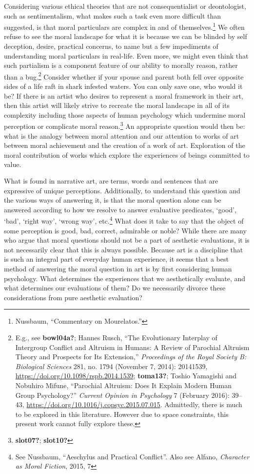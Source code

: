 \documentclass[
  12pt,
]{book}
\theoremstyle{definition}
\theoremstyle{definition}
\theoremstyle{definition}
\theoremstyle{definition}
\theoremstyle{remark}
\begin{document}
Considering various ethical theories that are not consequentialist or deontologist, such as sentimentalism, what makes such a task even more difficult than suggested, is that moral particulars are complex in and of themselves.\footnote{Nussbaum, {``Commentary on {Mourelatos}.''}} We often refuse to see the moral landscape for what it is because we can be blinded by self deception, desire, practical concerns, to name but a few impediments of understanding moral particulars in real-life. Even more, we might even think that such partialism is a component feature of our ability to morally reason, rather than a bug.\footnote{E.g., see \textbf{bowl04a?}; Hannes Rusch, {``The Evolutionary Interplay of Intergroup Conflict and Altruism in Humans: A Review of Parochial Altruism Theory and Prospects for Its Extension,''} \emph{Proceedings of the Royal Society B: Biological Sciences} 281, no. 1794 (November 7, 2014): 20141539, \url{https://doi.org/10.1098/rspb.2014.1539}; \textbf{toma13?}; Toshio Yamagishi and Nobuhiro Mifune, {``Parochial {Altruism}: {Does It Explain Modern Human Group Psychology}?''} \emph{Current Opinion in Psychology} 7 (February 2016): 39--43, \url{https://doi.org/10.1016/j.copsyc.2015.07.015}. Admittedly, there is much to be explored in this literature. However due to space constraints, this present work cannot fully explore these.} Consider whether if your spouse and parent both fell over opposite sides of a life raft in shark infested waters. You can only save one, who would it be? If there is an artist who desires to represent a moral framework in their art, then this artist will likely strive to recreate the moral landscape in all of its complexity including those aspects of human psychology which undermine moral perception or complicate moral reason.\footnote{\textbf{slot07?}; \textbf{slot10?}} An appropriate question would then be: what is the analogy between moral attention and our attention to works of art between moral achievement and the creation of a work of art. Exploration of the moral contribution of works which explore the experiences of beings committed to value.

What is found in narrative art, are terms, words and sentences that are expressive of unique perceptions. Additionally, to understand this question and the various ways of answering it, is that the moral question alone can be answered according to how we resolve to answer evaluative predicates, `good', `bad', `right way', `wrong way', etc.\footnote{See Nussbaum, {``Aeschylus and Practical Conflict''}. Also see Alfano, \emph{Character as Moral Fiction}, 2015, 7} What does it take to say that the object of some perception is good, bad, correct, admirable or noble? While there are many who argue that moral questions should not be a part of aesthetic evaluations, it is not necessarily clear that this is always possible. Because art is a discipline that is such an integral part of everyday human experience, it seems that a best method of answering the moral question in art is by first considering human psychology. What determines the experiences that we aesthetically evaluate, and what determines our evaluations of them? Do we necessarily divorce these considerations from pure aesthetic evaluation?
\end{document}
